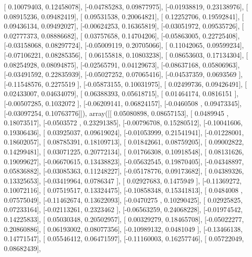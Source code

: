 \documentclass{article}
\begin{document}
       [ 0.10079403,  0.12458078],
       [-0.04785283,  0.09877975],
       [-0.01938819,  0.23138976],
       [ 0.08915236,  0.09482419],
       [ 0.09531538,  0.20064821],
       [ 0.12252706,  0.19592841],
       [ 0.09436134,  0.09492027],
       [-0.00624253,  0.16365819],
       [-0.03051972,  0.09535726],
       [ 0.02777373,  0.08886682],
       [ 0.03757658,  0.14704206],
       [-0.05863005,  0.22725408],
       [-0.03158068,  0.08297724],
       [-0.05009119,  0.20705066],
       [ 0.11042065,  0.09599234],
       [-0.07106221,  0.08285356],
       [ 0.06155818,  0.10803238],
       [ 0.08653603,  0.17134304],
       [ 0.08254928,  0.08094875],
       [-0.02565791,  0.04129673],
       [-0.08637168,  0.05806963],
       [-0.03491592,  0.22835939],
       [-0.05027252,  0.07065416],
       [-0.04537359,  0.0693569 ],
       [-0.11548576,  0.2275519 ],
       [-0.05873155,  0.10031975],
       [ 0.02499736,  0.09426491],
       [ 0.02433007,  0.04634079],
       [ 0.06388393,  0.05618715],
       [ 0.01464174,  0.0816151 ],
       [-0.00507285,  0.1032072 ],
       [-0.06209141,  0.06824157],
       [-0.0460508 ,  0.09473345],
       [-0.03097254,  0.10763776]]), array([[ 0.05080898,  0.08657153],
       [ 0.0489945 ,  0.18073517],
       [-0.0503572 ,  0.23291385],
       [-0.00796708,  0.15280512],
       [-0.10041606,  0.19306436],
       [ 0.03925037,  0.09619024],
       [-0.01053999,  0.21541941],
       [-0.01228001,  0.18602057],
       [ 0.08785391,  0.18109713],
       [ 0.01842661,  0.08759205],
       [ 0.09002822,  0.14299481],
       [ 0.03071225,  0.20772134],
       [ 0.01766308,  0.10918548],
       [ 0.08131626,  0.19099627],
       [-0.06670615,  0.13438823],
       [-0.05632545,  0.19870405],
       [-0.04348897,  0.05836882],
       [-0.03085363,  0.11248227],
       [-0.05178776,  0.09173682],
       [ 0.04389326,  0.13325653],
       [-0.03419964,  0.0786347 ],
       [ 0.02927683,  0.1475949 ],
       [-0.11369272,  0.10072116],
       [ 0.07519517,  0.13324475],
       [-0.10858348,  0.15341813],
       [ 0.0484008 ,  0.07575049],
       [-0.11462674,  0.13622093],
       [-0.0470275 ,  0.10290425],
       [ 0.02925825,  0.07233164],
       [-0.02113261,  0.2323462 ],
       [-0.06563259,  0.24068228],
       [-0.01974542,  0.14225833],
       [ 0.05030348,  0.20502957],
       [ 0.00329279,  0.18465708],
       [-0.05022277,  0.20860886],
       [ 0.06193002,  0.08077356],
       [-0.10989132,  0.0481049 ],
       [-0.13466138,  0.14771547],
       [ 0.05546412,  0.06471597],
       [-0.11160003,  0.16257746],
       [ 0.05722049,  0.08682439],
\end{document}
